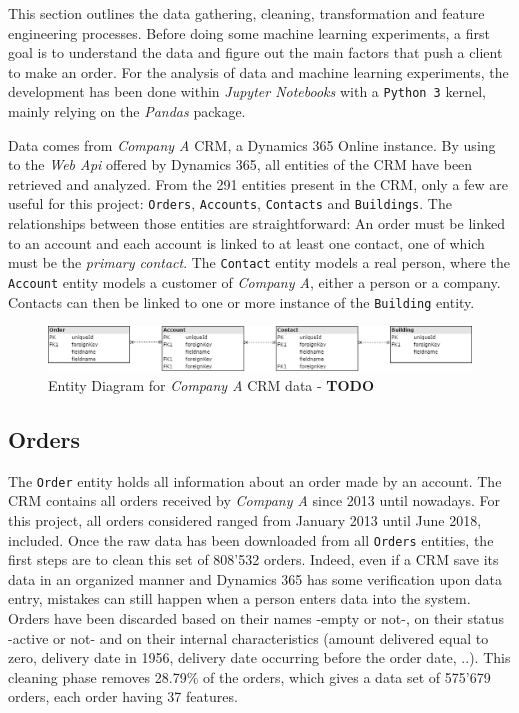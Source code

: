 This section outlines the data gathering, cleaning, transformation and feature engineering processes. Before doing some machine learning experiments, a first goal is to understand the data and figure out the main factors that push a client to make an order. For the analysis of data and machine learning experiments, the development has been done within \textit{Jupyter Notebooks} with a \texttt{Python 3} kernel, mainly relying on the \textit{Pandas} package.

Data comes from \textit{Company A} CRM, a Dynamics 365 Online instance. By using to the \textit{Web Api} offered by Dynamics 365, all entities of the CRM have been retrieved and analyzed. From the 291 entities present in the CRM, only a few are useful for this project: \texttt{Orders}, \texttt{Accounts}, \texttt{Contacts} and \texttt{Buildings}. The relationships between those entities are straightforward: An order must be linked to an account and each account is linked to at least one contact, one of which must be the \textit{primary contact}. The \texttt{Contact} entity models a real person, where the \texttt{Account} entity models a customer of \textit{Company A}, either a person or a company. Contacts can then be linked to one or more instance of the \texttt{Building} entity.

\begin{figure}[h]
    \centering
    \includegraphics[width=15cm]{images/entityDiagram.png}
    \caption{Entity Diagram for \textit{Company A} CRM data - \textbf{TODO}}
    \label{fig:entity-diagram}
\end{figure}

\subsection{Orders}\label{sec:crm-orders}

The \texttt{Order} entity holds all information about an order made by an account. The CRM contains all orders received by \textit{Company A} since 2013 until nowadays. For this project, all orders considered ranged from January 2013 until June 2018, included. Once the raw data has been downloaded from all \texttt{Orders} entities, the first steps are to clean this set of 808'532 orders. Indeed, even if a CRM save its data in an organized manner and Dynamics 365 has some verification upon data entry, mistakes can still happen when a person enters data into the system. Orders have been discarded based on their names -empty or not-, on their status -active or not- and on their internal characteristics (amount delivered equal to zero, delivery date in 1956, delivery date occurring before the order date, ..). This cleaning phase removes 28.79\% of the orders, which gives a data set of 575'679 orders, each order having 37 features.


